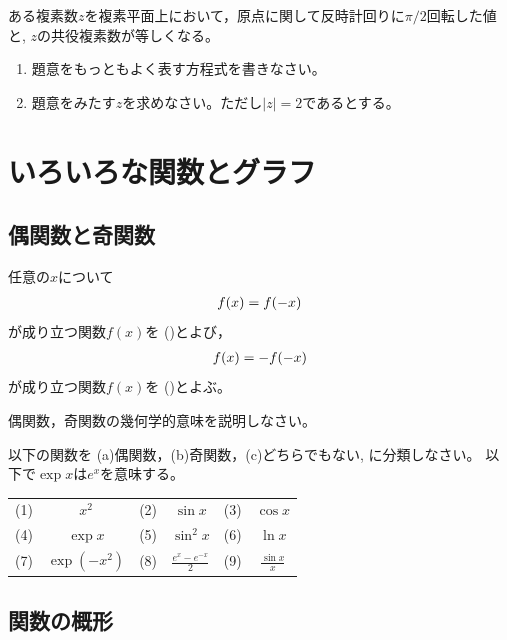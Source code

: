 \documentclass[twocolumn,11pt]{jarticle}
\begin{document}
\nquestion
ある複素数$z$を複素平面上において，原点に関して反時計回りに$\pi/2$回転した値と,
$z$の共役複素数が等しくなる。
\begin{enumerate}
\item 題意をもっともよく表す方程式を書きなさい。
\item 題意をみたす$z$を求めなさい。ただし$|z|=2$であるとする。
\end{enumerate}


\newpage

\section{いろいろな関数とグラフ}

\subsection{偶関数と奇関数}
任意の$x$について
\begin{align}
  f(x)=f(-x)\notag
\end{align}
が成り立つ関数$f(x)$を
()とよび，
\begin{align}
  f(x)=-f(-x)\notag
\end{align}
が成り立つ関数$f(x)$を
()とよぶ。

\nquestion
偶関数，奇関数の幾何学的意味を説明しなさい。

\nquestion
以下の関数を (a)偶関数，(b)奇関数，(c)どちらでもない,
に分類しなさい。
以下で$\exp x$は$e^x$を意味する。

\begin{tabular}{rcrcrc}
(1) & $x^2$ & (2) & $\sin x$ & (3) & $\cos x$ \\
(4) & $\exp x$ & (5) & $\sin^2 x$ & (6) & $\ln x$  \\
(7) & $\exp(-x^2)$ & (8) & $\displaystyle\frac{e^x-e^{-x}}{2}$ &
(9) & $\displaystyle\frac{\sin x}{x}$
\end{tabular}

\subsection{関数の概形\label{sec:graph}}
\end{document}
